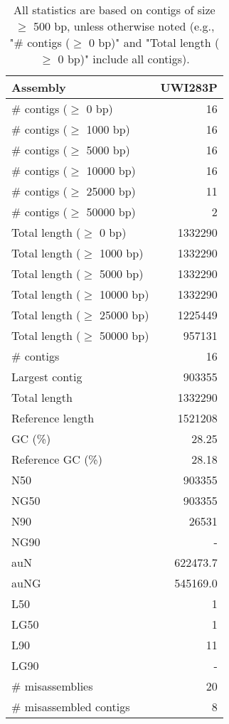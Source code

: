 \documentclass[12pt,a4paper]{article}
\begin{document}
\begin{table}[ht]
\begin{center}
\caption{All statistics are based on contigs of size $\geq$ 500 bp, unless otherwise noted (e.g., "\# contigs ($\geq$ 0 bp)" and "Total length ($\geq$ 0 bp)" include all contigs).}
\begin{tabular}{|l*{1}{|r}|}
\hline
Assembly & UWI283P \\ \hline
\# contigs ($\geq$ 0 bp) & 16 \\ \hline
\# contigs ($\geq$ 1000 bp) & 16 \\ \hline
\# contigs ($\geq$ 5000 bp) & 16 \\ \hline
\# contigs ($\geq$ 10000 bp) & 16 \\ \hline
\# contigs ($\geq$ 25000 bp) & 11 \\ \hline
\# contigs ($\geq$ 50000 bp) & 2 \\ \hline
Total length ($\geq$ 0 bp) & 1332290 \\ \hline
Total length ($\geq$ 1000 bp) & 1332290 \\ \hline
Total length ($\geq$ 5000 bp) & 1332290 \\ \hline
Total length ($\geq$ 10000 bp) & 1332290 \\ \hline
Total length ($\geq$ 25000 bp) & 1225449 \\ \hline
Total length ($\geq$ 50000 bp) & 957131 \\ \hline
\# contigs & 16 \\ \hline
Largest contig & 903355 \\ \hline
Total length & 1332290 \\ \hline
Reference length & 1521208 \\ \hline
GC (\%) & 28.25 \\ \hline
Reference GC (\%) & 28.18 \\ \hline
N50 & 903355 \\ \hline
NG50 & 903355 \\ \hline
N90 & 26531 \\ \hline
NG90 & - \\ \hline
auN & 622473.7 \\ \hline
auNG & 545169.0 \\ \hline
L50 & 1 \\ \hline
LG50 & 1 \\ \hline
L90 & 11 \\ \hline
LG90 & - \\ \hline
\# misassemblies & 20 \\ \hline
\# misassembled contigs & 8 \\ \hline

\end{tabular}
\end{center}
\end{table}
\end{document}
